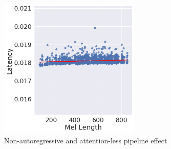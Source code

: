 \begin{frame}
\begin{table}[!ht]
\centering
{}
\caption{TalkNet inference latency for mel-spectrogram generation (without vocoder). The latency was measured with batch size $1$ using a V100 GPU and averaged over 2048 samples from LJSpeech. Latency and Real-Time-Factor (RTF) with $95\%$ confidence interval.}
\end{table}
\end{frame}

\begin{frame}
\begin{figure}[H]
\centering
\includegraphics[width=0.6\textwidth]{images/len-lat.png}
\caption{Non-autoregressive and attention-less pipeline effect}
\end{figure}
\end{frame}

